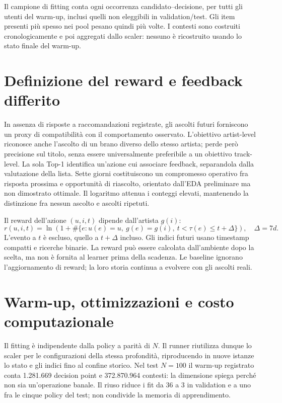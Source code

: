 Il campione di fitting conta ogni occorrenza candidato--decisione, per tutti gli utenti del warm-up, inclusi quelli non eleggibili in validation/test. Gli item presenti più spesso nei pool pesano quindi più volte. I contesti sono costruiti cronologicamente e poi aggregati dallo scaler: nessuno è ricostruito usando lo stato finale del warm-up.

\section{Definizione del reward e feedback differito}
In assenza di risposte a raccomandazioni registrate, gli ascolti futuri forniscono un proxy di compatibilità con il comportamento osservato. L'obiettivo artist-level riconosce anche l'ascolto di un brano diverso dello stesso artista; perde però precisione sul titolo, senza essere universalmente preferibile a un obiettivo track-level. La sola Top-1 identifica un'azione cui associare feedback, separandola dalla valutazione della lista. Sette giorni costituiscono un compromesso operativo fra risposta prossima e opportunità di riascolto, orientato dall'EDA preliminare ma non dimostrato ottimale. Il logaritmo attenua i conteggi elevati, mantenendo la distinzione fra nessun ascolto e ascolti ripetuti.

Il reward dell'azione $(u,i,t)$ dipende dall'artista $g(i)$:
\begin{equation}
r(u,i,t)=\ln\!\left(1+\#\{e:u(e)=u,\ g(e)=g(i),\
t<\tau(e)\leq t+\Delta\}\right),\quad \Delta=7d.\label{eq:reward}
\end{equation}
L'evento a $t$ è escluso, quello a $t+\Delta$ incluso. Gli indici futuri usano timestamp compatti e ricerche binarie. La reward può essere calcolata dall'ambiente dopo la scelta, ma non è fornita al learner prima della scadenza. Le baseline ignorano l'aggiornamento di reward; la loro storia continua a evolvere con gli ascolti reali.

\clearpage
\section{Warm-up, ottimizzazioni e costo computazionale}
Il fitting è indipendente dalla policy a parità di $N$. Il runner riutilizza dunque lo scaler per le configurazioni della stessa profondità, riproducendo in nuove istanze lo stato e gli indici fino al confine storico. Nel test $N=100$ il warm-up registrato conta 1.281.669 decision point e 372.870.964 contesti: la dimensione spiega perché non sia un'operazione banale. Il riuso riduce i fit da 36 a 3 in validation e a uno fra le cinque policy del test; non condivide la memoria di apprendimento.

